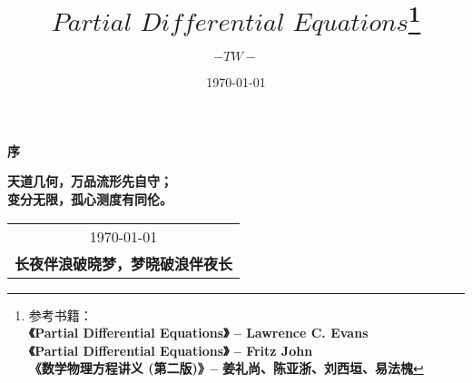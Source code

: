 \title{{\Huge{\textbf{$Partial \,\, Differential \,\, Equations$}}}\footnote{参考书籍：\\
			\hspace*{4em} \textbf{《Partial Differential Equations》 -- Lawrence C. Evans} \\
			\hspace*{4em} \textbf{《Partial Differential Equations》 -- Fritz John} \\
			\hspace*{4em} \textbf{《数学物理方程讲义 (第二版)》--  姜礼尚、陈亚浙、刘西垣、易法槐} 
			}}
\author{$-TW-$}
\date{\today}
\maketitle                   %

\thispagestyle{empty}        %
\begin{center}
	\Huge\textbf{序}
\end{center}


\vspace*{3em}
\begin{center}
	\large{\textbf{天道几何，万品流形先自守；}}\\
	
	\large{\textbf{变分无限，孤心测度有同伦。}}
\end{center}

\vspace*{3em}
\begin{flushright}
	\begin{tabular}{c}
		\today \\ \small{\textbf{长夜伴浪破晓梦，梦晓破浪伴夜长}}
	\end{tabular}
\end{flushright}


\newpage                      %
\pagestyle{plain}             %
\setcounter{page}{1}          %
\tableofcontents              %

\newpage                      %
\pagestyle{plain}
\setcounter{page}{1}          %
\setcounter{chapter}{0}    %